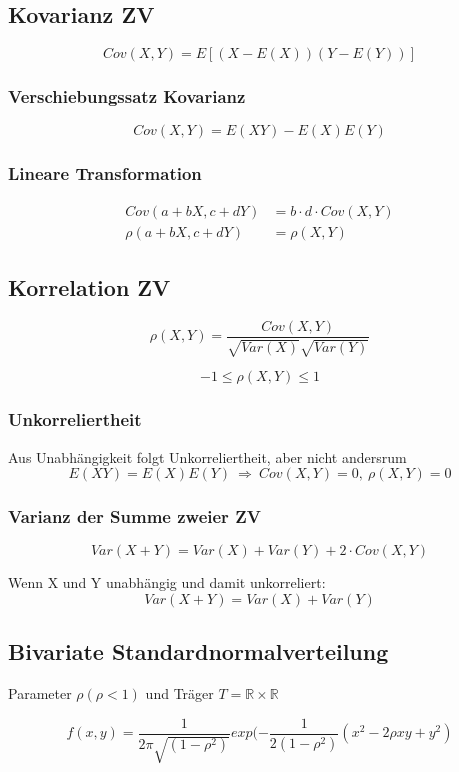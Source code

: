 \documentclass[10pt,a4paper,landscape]{article}
\begin{document}
\begin{multicols}{4}
\subsection{Kovarianz ZV}
\[
Cov(X,Y)=E[(X-E(X))(Y-E(Y))]
\]

\subsubsection{Verschiebungssatz Kovarianz}
\[
Cov(X,Y)=E(XY)-E(X)E(Y)
\]

\subsubsection{Lineare Transformation}
\begin{align*}
Cov(a+bX,c+dY)&=b\cdot d \cdot Cov(X,Y)\\
\rho(a+bX, c+dY) &= \rho(X,Y)
\end{align*}

\subsection{Korrelation ZV}
\[
\rho(X,Y)=\frac{Cov(X,Y)}{\sqrt{Var(X)}\sqrt{Var(Y)}}
\]

\[-1 \leq \rho(X,Y) \leq 1\]

\subsubsection{Unkorreliertheit}
Aus Unabhängigkeit folgt Unkorreliertheit, aber nicht andersrum
\[
E(XY)=E(X)E(Y) ~ \Rightarrow ~ Cov(X,Y)=0,~ \rho(X,Y)=0
\]

\subsubsection{Varianz der Summe zweier ZV}
\[
Var(X+Y)=Var(X)+Var(Y)+2\cdot Cov(X,Y)
\]

Wenn X und Y unabhängig und damit unkorreliert:
\[
Var(X+Y)=Var(X)+Var(Y)
\]

\subsection{Bivariate Standardnormalverteilung}
Parameter $\rho(\rho<1)$ und Träger $T=\mathbb{R}\times\mathbb{R}$

\[
f(x,y)=\frac{1}{2\pi \sqrt{(1-\rho^2)}}exp(-\frac{1}{2(1-\rho^2)}(x^2-2\rho xy+y^2)
\]


\end{multicols}
\end{document}
